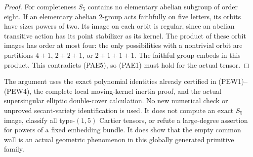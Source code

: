 \begin{proof}
For completeness \(S_5\) contains no elementary abelian
subgroup of order eight.  If an elementary abelian \(2\)-group
acts faithfully on five letters, its orbits have sizes powers
of two.  Its image on each orbit is regular, since an abelian
transitive action has its point stabilizer as its kernel.
The product of these orbit images has order at most four:
the only possibilities with a nontrivial orbit are partitions
\(4+1\), \(2+2+1\), or \(2+1+1+1\).  The faithful group
embeds in this product.  This contradicts (PAE5), so (PAE1)
must hold for the actual tensor.
\end{proof}

\begin{remark}
\label{rem:prime-five-actual-exceptional-ratio-scope}
The argument uses the exact polynomial identities already
certified in (PEW1)--(PEW4), the complete local moving-kernel
inertia proof, and the actual supersingular elliptic double-cover
calculation.  No new numerical check or unproved secant-variety
identification is used.  It does not compute an exact \(S_5\)
image, classify all type-\((1,5)\) Cartier tensors, or refute a
large-degree assertion for powers of a fixed embedding bundle.
It does show that the empty common wall is an actual geometric
phenomenon in this globally generated primitive family.
\end{remark}
